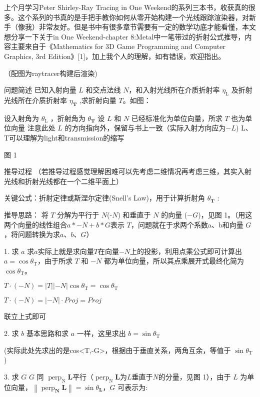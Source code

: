 上个月学习Peter Shirley-Ray Tracing in One Weekend的系列三本书，收获真的很多。这个系列的书真的是手把手教你如何从零开始构建一个光线跟踪渲染器，对新手（像我）非常友好。但是书中有很多章节需要有一定的数学功底才能看懂，本文想分享一下关于in One Weekend-chapter 8:Metal中一笔带过的折射公式推导，内容主要来自于《Mathematics for 3D Game Programming and Computer Graphics, 3rd Edition》[1]，加上我个人的理解，如有错误，欢迎指出。

（配图为raytracer构建后渲染)

问题简述
已知入射向量 \(L\) 和交点法线 \(N\)，和入射光线所在介质折射率 \(\eta _ { \mathrm { L } }\) 及折射光线所在介质折射率 \(\eta _ { \mathbf { T } }\) ,求折射向量 \(T\)。如图：

设入射角为 \(\theta _ { \mathrm { L } }\) ，折射角为 \(\theta _ { \mathbf { T } }\)
设 \(L\) 和 \(N\) 已经标准化为单位向量，所求 \(T\) 也为单位向量
注意此处 \(L\) 的方向指向外，保留与书上一致（实际入射方向应为\(-L\))
L、T可以理解为light和transmission的缩写


图 1

推导过程
（若推导过程感觉理解困难可以先考虑二维情况再考虑三维，其实入射光线和折射光线都在一个二维平面上）

关键公式：折射定律或斯涅尔定律(Snell's Law)，用于计算折射角 \(\theta _ { \mathbf { T } }\) :


推导思路：
将 \(T\) 分解为平行于 \(N\)(-\(N\)) 和垂直于 \(N\) 的向量 (\(-G\))，见图 1。（用这两个向量的线性组合\(a*-N+b*G\)表示 \(T\)，问题就在于求两个系数a、b和向量 \(G\)，将问题转换为求\(a\)、\(b\)、\(G\)）

1. 求 \(a\)
求\(a\)实际上就是求向量\(T\)在向量\(-N\)上的投影，利用点乘公式即可计算出\(a=\cos \theta _ { \mathrm { T } }\)，由于所求 \(T\) 和 \(-N\) 都为单位向量，所以其点乘展开式最终化简为\(\cos \theta _ { \mathrm { T } }\)。

\(T \cdot (-N) = |T| |-N| \cos \theta _ { \mathrm { T } }=\cos \theta _ { \mathrm { T } }\)

\(T \cdot (-N) = |-N|\cdotp Proj = Proj\)

联立上式即可

2. 求 \(b\)
基本思路和求 \(a\) 一样，这里求出 \(b = \sin \theta _ { \mathrm { T } }\)

(实际此处先求出的是cos<T,-G>，根据由于垂直关系，两角互余，等值于 \(\sin \theta _ { \mathrm { T } }\) )

3. 求 \(G\)
\(G\) 同 \(\operatorname { perp } _ { \mathrm { N } } \mathbf { L }\)平行（\(\operatorname { perp } _ { \mathrm { N } } \mathbf { L }\)为\(L\)垂直于\(N\)的分量，见图 1），由于 \(L\) 为单位向量，\(\left\| \operatorname { perp } _ { \mathbf { N } } \mathbf { L } \right\| = \sin \theta _ { \mathbf { L } }\)，\(G\) 可表示为:

